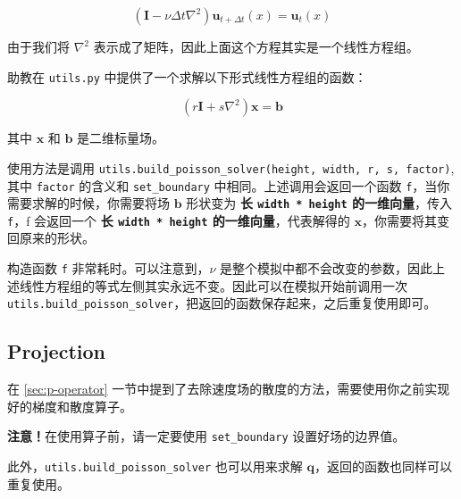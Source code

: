 \documentclass{ctexart}
\begin{document}
\begin{equation}
(\textbf{I} - \nu \Delta t \nabla^2) \mathbf{u}_{t+\Delta t}(x) = \mathbf{u}_t (x)
\end{equation}

由于我们将 $\nabla ^ 2$ 表示成了矩阵，因此上面这个方程其实是一个线性方程组。

助教在 \texttt{utils.py} 中提供了一个求解以下形式线性方程组的函数：

\begin{equation}
(r \textbf{I} + s \nabla^2) \mathbf{x} = \mathbf{b}
\end{equation}

其中 $\mathbf{x}$ 和 $\mathbf{b}$ 是二维标量场。

使用方法是调用 \texttt{utils.build\_poisson\_solver(height, width, r, s, factor)}, 其中 \texttt{factor} 的含义和 \texttt{set\_boundary} 中相同。上述调用会返回一个函数 \texttt{f}，当你需要求解的时候，你需要将场 $\mathbf{b}$ 形状变为 \textbf{长 \texttt{width * height} 的一维向量}，传入 \texttt{f}，f 会返回一个 \textbf{长 \texttt{width * height} 的一维向量}，代表解得的 $\mathbf{x}$，你需要将其变回原来的形状。

构造函数 \texttt{f} 非常耗时。可以注意到，$\nu$ 是整个模拟中都不会改变的参数，因此上述线性方程组的等式左侧其实永远不变。因此可以在模拟开始前调用一次 \texttt{utils.build\_poisson\_solver}，把返回的函数保存起来，之后重复使用即可。

\subsection{Projection}
在 \ref{sec:p-operator} 一节中提到了去除速度场的散度的方法，需要使用你之前实现好的梯度和散度算子。

\textbf{注意！}在使用算子前，请一定要使用 \texttt{set\_boundary} 设置好场的边界值。

此外，\texttt{utils.build\_poisson\_solver} 也可以用来求解 $\mathbf{q}$，返回的函数也同样可以重复使用。
\end{document}

